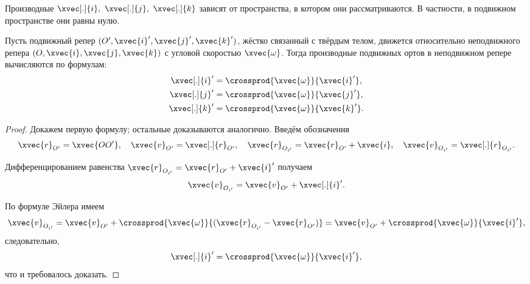 Производные $\xvec[.]{i},~\xvec[.]{j},~\xvec[.]{k}$ зависят от
пространства, в котором они рассматриваются. В частности, в подвижном
пространстве они равны нулю.

\begin{theorem}
  Пусть подвижный репер $(O', \xvec{i}', \xvec{j}', \xvec{k}')$, жёстко
  связанный с твёрдым телом, движется относительно неподвижного репера
  $(O, \xvec{i}, \xvec{j}, \xvec{k})$ с угловой скоростью $\xvec{\omega}$. Тогда
  производные подвижных ортов в неподвижном репере вычисляются по формулам:
  \begin{equation}
    \label{eq:poisson_formulas}
    \begin{aligned}
      \xvec[.]{i}' &= \crossprod{\xvec{\omega}}{\xvec{i}'}, \\
      \xvec[.]{j}' &= \crossprod{\xvec{\omega}}{\xvec{j}'}, \\
      \xvec[.]{k}' &= \crossprod{\xvec{\omega}}{\xvec{k}'}.
    \end{aligned}
  \end{equation}
\end{theorem}

\begin{proof}
  Докажем первую формулу; остальные доказываются аналогично. Введём обозначения
  \begin{equation*}
    \xvec{r}_{O'} = \xvec{OO'}, \quad
    \xvec{v}_{O'} = \xvec[.]{r}_{O'}, \quad
    \xvec{r}_{O_{i'}} = \xvec{r}_{O'} + \xvec{i}, \quad
    \xvec{v}_{O_{i'}} = \xvec[.]{r}_{O_{i'}}.
  \end{equation*}

  Дифференцированием равенства $\xvec{r}_{O_{i'}} = \xvec{r}_{O'} + \xvec{i}'$
  получаем
  \begin{equation*}
    \xvec{v}_{O_{i'}} = \xvec{v}_{O'} + \xvec[.]{i}'.
  \end{equation*}

  По формуле Эйлера имеем
  \begin{equation*}
    \xvec{v}_{O_{i'}} = \xvec{v}_{O'} +
      \crossprod{\xvec{\omega}}{(\xvec{r}_{O_{i'}} - \xvec{r}_{O'})}
    = \xvec{v}_{O'} + \crossprod{\xvec{\omega}}{\xvec{i}'},
  \end{equation*}
  следовательно,
  \begin{equation*}
    \xvec[.]{i}' = \crossprod{\xvec{\omega}}{\xvec{i}'},
  \end{equation*}
  что и требовалось доказать.
\end{proof}

